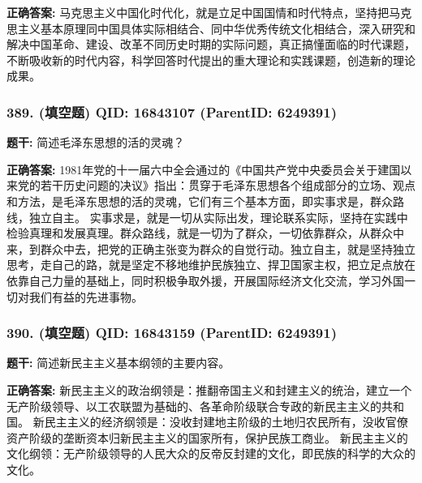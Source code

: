 \documentclass[12pt,UTF8]{ctexart}
\begin{document}
\textbf{正确答案:}
马克思主义中国化时代化，就是立足中国国情和时代特点，坚持把马克思主义基本原理同中国具体实际相结合、同中华优秀传统文化相结合，深入研究和解决中国革命、建设、改革不同历史时期的实际问题，真正搞懂面临的时代课题，不断吸收新的时代内容，科学回答时代提出的重大理论和实践课题，创造新的理论成果。

\vspace{0.3em}\hrulefill\vspace{0.7em}

\subsubsection*{389. (填空题) \small QID: 16843107 (ParentID: 6249391)}

\textbf{题干:}
简述毛泽东思想的活的灵魂？



\textbf{正确答案:}
1981年党的十一届六中全会通过的《中国共产党中央委员会关于建国以来党的若干历史问题的决议》指出：贯穿于毛泽东思想各个组成部分的立场、观点和方法，是毛泽东思想的活的灵魂，它们有三个基本方面，即实事求是，群众路线，独立自主。
实事求是，就是一切从实际出发，理论联系实际，坚持在实践中检验真理和发展真理。群众路线，就是一切为了群众，一切依靠群众，从群众中来，到群众中去，把党的正确主张变为群众的自觉行动。独立自主，就是坚持独立思考，走自己的路，就是坚定不移地维护民族独立、捍卫国家主权，把立足点放在依靠自己力量的基础上，同时积极争取外援，开展国际经济文化交流，学习外国一切对我们有益的先进事物。

\vspace{0.3em}\hrulefill\vspace{0.7em}

\subsubsection*{390. (填空题) \small QID: 16843159 (ParentID: 6249391)}

\textbf{题干:}
简述新民主主义基本纲领的主要内容。



\textbf{正确答案:}
新民主主义的政治纲领是：推翻帝国主义和封建主义的统治，建立一个无产阶级领导、以工农联盟为基础的、各革命阶级联合专政的新民主主义的共和国。
新民主主义的经济纲领是：没收封建地主阶级的土地归农民所有，没收官僚资产阶级的垄断资本归新民主主义的国家所有，保护民族工商业。
新民主主义的文化纲领：无产阶级领导的人民大众的反帝反封建的文化，即民族的科学的大众的文化。

\vspace{0.3em}\hrulefill\vspace{0.7em}
\end{document}
